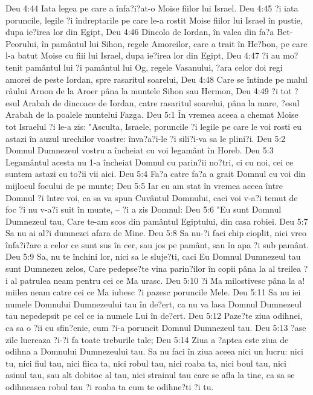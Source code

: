 Deu 4:44  Iata legea pe care a înfa?i?at-o Moise fiilor lui Israel.
Deu 4:45  ?i iata poruncile, legile ?i îndreptarile pe care le-a rostit Moise fiilor lui Israel în pustie, dupa ie?irea lor din Egipt,
Deu 4:46  Dincolo de Iordan, în valea din fa?a Bet-Peorului, în pamântul lui Sihon, regele Amoreilor, care a trait în He?bon, pe care l-a batut Moise cu fiii lui Israel, dupa ie?irea lor din Egipt,
Deu 4:47  ?i au mo?tenit pamântul lui ?i pamântul lui Og, regele Vasanului, ?ara celor doi regi amorei de peste Iordan, spre rasaritul soarelui,
Deu 4:48  Care se întinde pe malul râului Arnon de la Aroer pâna la muntele Sihon sau Hermon,
Deu 4:49  ?i tot ?esul Arabah de dincoace de Iordan, catre rasaritul soarelui, pâna la mare, ?esul Arabah de la poalele muntelui Fazga.
Deu 5:1  În vremea aceea a chemat Moise tot Israelul ?i le-a zis: "Asculta, Israele, poruncile ?i legile pe care le voi rosti eu astazi în auzul urechilor voastre: înva?a?i-le ?i sili?i-va sa le plini?i.
Deu 5:2  Domnul Dumnezeul vostru a încheiat cu voi legamânt în Horeb.
Deu 5:3  Legamântul acesta nu 1-a încheiat Domnul cu parin?ii no?tri, ci cu noi, cei ce suntem astazi cu to?ii vii aici.
Deu 5:4  Fa?a catre fa?a a grait Domnul cu voi din mijlocul focului de pe munte;
Deu 5:5  Iar eu am stat în vremea aceea între Domnul ?i între voi, ca sa va spun Cuvântul Domnului, caci voi v-a?i temut de foc ?i nu v-a?i suit în munte, -- ?i a zis Domnul:
Deu 5:6  "Eu sunt Domnul Dumnezeul tau, Care te-am scos din pamântul Egiptului, din casa robiei.
Deu 5:7  Sa nu ai al?i dumnezei afara de Mine.
Deu 5:8  Sa nu-?i faci chip cioplit, nici vreo înfa?i?are a celor ce sunt sus în cer, sau jos pe pamânt, sau în apa ?i sub pamânt.
Deu 5:9  Sa, nu te închini lor, nici sa le sluje?ti, caci Eu Domnul Dumnezeul tau sunt Dumnezeu zelos, Care pedepse?te vina parin?ilor în copii pâna la al treilea ?i al patrulea neam pentru cei ce Ma urasc.
Deu 5:10  ?i Ma milostivesc pâna la a! miilea neam catre cei ce Ma iubesc ?i pazesc poruncile Mele.
Deu 5:11  Sa nu iei numele Domnului Dumnezeului tau în de?ert, ca nu va lasa Domnul Dumnezeul tau nepedepsit pe cel ce ia numele Lui în de?ert.
Deu 5:12  Paze?te ziua odihnei, ca sa o ?ii cu sfin?enie, cum ?i-a poruncit Domnul Dumnezeul tau.
Deu 5:13  ?ase zile lucreaza ?i-?i fa toate treburile tale;
Deu 5:14  Ziua a ?aptea este ziua de odihna a Domnului Dumnezeului tau. Sa nu faci în ziua aceea nici un lucru: nici tu, nici fiul tau, nici fiica ta, nici robul tau, nici roaba ta, nici boul tau, nici asinul tau, sau alt dobitoc al tau, nici strainul tau care se afla la tine, ca sa se odihneasca robul tau ?i roaba ta cum te odihne?ti ?i tu.
